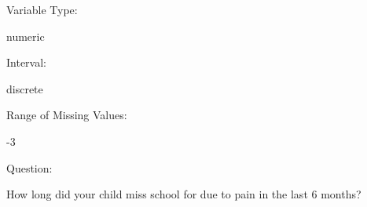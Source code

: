 \documentclass[
]{article}
\begin{document}
\begin{minipage}[t]{0.3\linewidth}

\colorbox{mypink1}{}

\end{minipage}%
\begin{minipage}[t]{0.7\linewidth}

\colorbox{mypink1}{\makebox[\textwidth]{\strut\bfseries\color{black}  
 }}

\end{minipage}

\begin{minipage}[t]{0.3\linewidth}

Variable Type:

\end{minipage}%
\begin{minipage}[t]{0.7\linewidth}

numeric

\end{minipage}

\begin{minipage}[t]{0.3\linewidth}

Interval:

\end{minipage}%
\begin{minipage}[t]{0.7\linewidth}

discrete

\end{minipage}

\begin{minipage}[t]{0.3\linewidth}

Range of Missing Values:

\end{minipage}%
\begin{minipage}[t]{0.7\linewidth}

-3

\end{minipage}

\begin{minipage}[t]{0.3\linewidth}

Question:

\end{minipage}%
\begin{minipage}[t]{0.7\linewidth}

How long did your child miss school for due to pain in the last 6
months?

\end{minipage}
\end{document}
